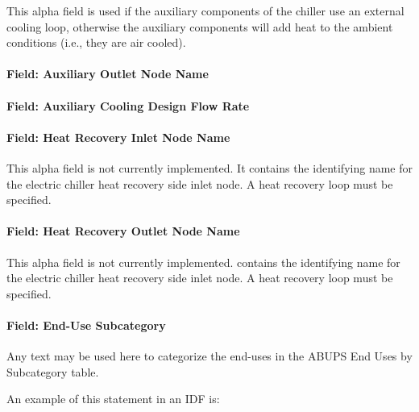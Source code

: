 This alpha field is used if the auxiliary components of the chiller use an external cooling loop, otherwise the auxiliary components will add heat to the ambient conditions (i.e., they are air cooled).

\paragraph{Field: Auxiliary Outlet Node Name}\label{field-chiller205-auxiliary-outlet-node-name}

\paragraph{Field: Auxiliary Cooling Design Flow Rate}\label{field-chiller205-auxiliary-cooling-design-flow-rate}

\paragraph{Field: Heat Recovery Inlet Node Name}\label{field-chiller205-heat-recover-inlet-node-name}

This alpha field is not currently implemented. It contains the identifying name for the electric chiller heat recovery side inlet node. A heat recovery loop must be specified.

\paragraph{Field: Heat Recovery Outlet Node Name}\label{field-chiller205-heat-recovery-outlet-node-name}

This alpha field is not currently implemented. contains the identifying name for the electric chiller heat recovery side inlet node. A heat recovery loop must be specified.

\paragraph{Field: End-Use Subcategory}\label{field-chiller205-end-use-subcategory}

Any text may be used here to categorize the end-uses in the ABUPS End Uses by Subcategory table.

An example of this statement in an IDF is:

